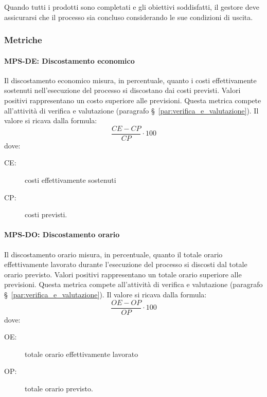 \documentclass[../../norme-di-progetto.tex]{subfiles}
\begin{document}
Quando tutti i prodotti sono completati e gli obiettivi soddisfatti, il gestore deve assicurarsi che il processo sia concluso considerando le sue condizioni di uscita.

\subsubsection{Metriche}%
\label{subs:gestione-di-processo/metriche}

\paragraph{MPS-DE: Discostamento economico}%
\label{par:MPS-DE_discostamento_economico}

Il discostamento economico misura, in percentuale, quanto i costi effettivamente sostenuti nell'esecuzione del processo si discostano dai costi previsti.
Valori positivi rappresentano un costo superiore alle previsioni.
Questa metrica compete all'attività di verifica e valutazione (paragrafo §~\ref{par:verifica_e_valutazione}).
Il valore si ricava dalla formula:
\begin{equation}
  \frac{CE-CP}{CP}\cdot 100
\end{equation}
dove:
\begin{description}
  \item[CE:] costi effettivamente sostenuti
  \item[CP:] costi previsti.
\end{description}

\paragraph{MPS-DO: Discostamento orario}%
\label{par:MPS-DO_discostamento_orario}

Il discostamento orario misura, in percentuale, quanto il totale orario effettivamente lavorato durante l'esecuzione del processo si discosti dal totale orario previsto.
Valori positivi rappresentano un totale orario superiore alle previsioni.
Questa metrica compete all'attività di verifica e valutazione (paragrafo §~\ref{par:verifica_e_valutazione}).
Il valore si ricava dalla formula:
\begin{equation}
  \frac{OE-OP}{OP}\cdot 100
\end{equation}
dove:
\begin{description}
  \item[OE:] totale orario effettivamente lavorato
  \item[OP:] totale orario previsto.
\end{description}
\end{document}
